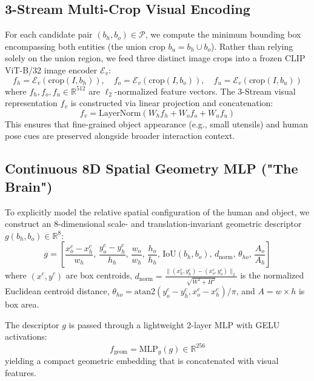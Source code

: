 \documentclass[conference]{IEEEtran}
\begin{document}
\subsection{3-Stream Multi-Crop Visual Encoding}
For each candidate pair $(b_h, b_o) \in \mathcal{P}$, we compute the minimum bounding box encompassing both entities (the union crop $b_u = b_h \cup b_o$). Rather than relying solely on the union region, we feed three distinct image crops into a frozen CLIP ViT-B/32 image encoder $\mathcal{E}_v$:
\begin{equation}
    f_h = \mathcal{E}_v(\text{crop}(I, b_h)), \quad
    f_o = \mathcal{E}_v(\text{crop}(I, b_o)), \quad
    f_u = \mathcal{E}_v(\text{crop}(I, b_u))
\end{equation}
where $f_h, f_o, f_u \in \mathbb{R}^{512}$ are $\ell_2$-normalized feature vectors. The 3-Stream visual representation $f_v$ is constructed via linear projection and concatenation:
\begin{equation}
    f_v = \text{LayerNorm}\left( W_h f_h + W_o f_o + W_u f_u \right)
\end{equation}
This ensures that fine-grained object appearance (e.g., small utensils) and human pose cues are preserved alongside broader interaction context.

\subsection{Continuous 8D Spatial Geometry MLP ("The Brain")}
To explicitly model the relative spatial configuration of the human and object, we construct an 8-dimensional scale- and translation-invariant geometric descriptor $g(b_h, b_o) \in \mathbb{R}^8$:
\begin{equation}
    g = \left[ 
        \frac{x_o^c - x_h^c}{w_h}, \,
        \frac{y_o^c - y_h^c}{h_h}, \,
        \frac{w_o}{w_h}, \,
        \frac{h_o}{h_h}, \,
        \text{IoU}(b_h, b_o), \,
        d_{\text{norm}}, \,
        \theta_{ho}, \,
        \frac{A_o}{A_h}
    \right]
\end{equation}
where $(x^c, y^c)$ are box centroids, $d_{\text{norm}} = \frac{\|(x_h^c, y_h^c) - (x_o^c, y_o^c)\|_2}{\sqrt{W^2 + H^2}}$ is the normalized Euclidean centroid distance, $\theta_{ho} = \text{atan2}(y_o^c - y_h^c, x_o^c - x_h^c) / \pi$, and $A = w \times h$ is box area.

The descriptor $g$ is passed through a lightweight 2-layer MLP with GELU activations:
\begin{equation}
    f_{\text{geom}} = \text{MLP}_g(g) \in \mathbb{R}^{256}
\end{equation}
yielding a compact geometric embedding that is concatenated with visual features.
\end{document}
